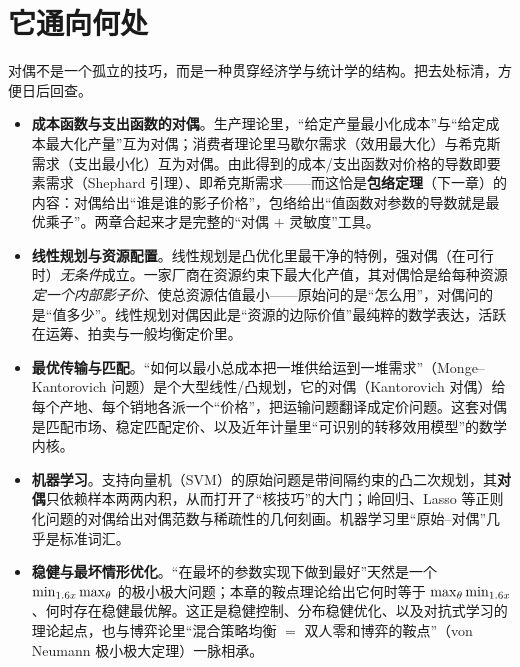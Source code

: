 \section{它通向何处}
\label{sec:duality-6}

对偶不是一个孤立的技巧，而是一种贯穿经济学与统计学的结构。把去处标清，方便日后回查。

\begin{itemize}
    \item \textbf{成本函数与支出函数的对偶}。生产理论里，``给定产量最小化成本''与``给定成本最大化产量''互为对偶；消费者理论里马歇尔需求（效用最大化）与希克斯需求（支出最小化）互为对偶。由此得到的成本/支出函数对价格的导数即要素需求（Shephard 引理）、即希克斯需求——而这恰是\textbf{包络定理}（下一章）的内容：对偶给出``谁是谁的影子价格''，包络给出``值函数对参数的导数就是最优乘子''。两章合起来才是完整的``对偶 $+$ 灵敏度''工具。
    \item \textbf{线性规划与资源配置}。线性规划是凸优化里最干净的特例，强对偶（在可行时）\emph{无条件}成立。一家厂商在资源约束下最大化产值，其对偶恰是给每种资源\emph{定一个内部影子价}、使总资源估值最小——原始问的是``怎么用''，对偶问的是``值多少''。线性规划对偶因此是``资源的边际价值''最纯粹的数学表达，活跃在运筹、拍卖与一般均衡定价里。
    \item \textbf{最优传输与匹配}。``如何以最小总成本把一堆供给运到一堆需求''（Monge--Kantorovich 问题）是个大型线性/凸规划，它的对偶（Kantorovich 对偶）给每个产地、每个销地各派一个``价格''，把运输问题翻译成定价问题。这套对偶是匹配市场、稳定匹配定价、以及近年计量里``可识别的转移效用模型''的数学内核。
    \item \textbf{机器学习}。支持向量机（SVM）的原始问题是带间隔约束的凸二次规划，其\textbf{对偶}只依赖样本两两内积，从而打开了``核技巧''的大门；岭回归、Lasso 等正则化问题的对偶给出对偶范数与稀疏性的几何刻画。机器学习里``原始--对偶''几乎是标准词汇。
    \item \textbf{稳健与最坏情形优化}。``在最坏的参数实现下做到最好''天然是一个 $\min_{1.6 x}\max_{\theta}$ 的极小极大问题；本章的鞍点理论给出它何时等于 $\max_\theta\min_{1.6 x}$、何时存在稳健最优解。这正是稳健控制、分布稳健优化、以及对抗式学习的理论起点，也与博弈论里``混合策略均衡 $=$ 双人零和博弈的鞍点''（von Neumann 极小极大定理）一脉相承。
\end{itemize}

